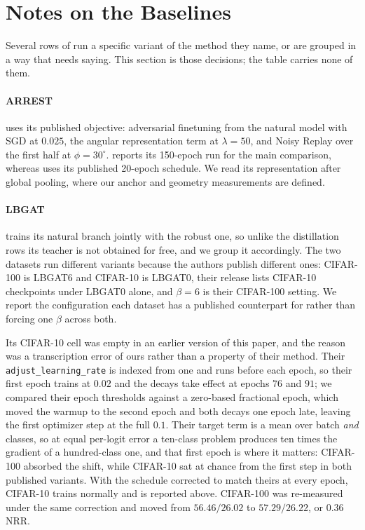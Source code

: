 \section{Notes on the Baselines}
\label{app:baselines}

Several rows of  run a specific variant of the method they name, or are grouped in a
way that needs saying. This section is those decisions; the table carries none of them.

\paragraph{ARREST} uses its published objective: adversarial finetuning from the natural model with
SGD at $0.025$, the angular representation term at $\lambda = 50$, and Noisy Replay over the first
half at $\phi = 30^\circ$.  reports its 150-epoch run for the main comparison, whereas
 uses its published 20-epoch schedule.
We read its representation after global pooling, where our anchor and geometry measurements are
defined.

\paragraph{LBGAT} trains its natural branch jointly with the robust one, so unlike the distillation
rows its teacher is not obtained for free, and we group it accordingly. The two datasets run different
variants because the authors publish different ones: CIFAR-100 is LBGAT6 and CIFAR-10 is LBGAT0, their
release lists CIFAR-10 checkpoints under LBGAT0 alone, and $\beta = 6$ is their CIFAR-100 setting. We
report the configuration each dataset has a published counterpart for rather than forcing one $\beta$
across both.

Its CIFAR-10 cell was empty in an earlier version of this paper, and the reason was a transcription
error of ours rather than a property of their method. Their \texttt{adjust\_learning\_rate} is indexed
from one and runs before each epoch, so their first epoch trains at $0.02$ and the decays take effect
at epochs $76$ and $91$; we compared their epoch thresholds against a zero-based fractional epoch,
which moved the warmup to the second epoch and both decays one epoch late, leaving the first optimizer
step at the full $0.1$. Their target term is a mean over batch \emph{and} classes, so at equal
per-logit error a ten-class problem produces ten times the gradient of a hundred-class one, and that
first epoch is where it matters: CIFAR-100 absorbed the shift, while CIFAR-10 sat at chance from the
first step in both published variants. With the schedule corrected to match theirs at every epoch,
CIFAR-10 trains normally and is reported above. CIFAR-100 was re-measured under the same correction
and moved from $56.46/26.02$ to $57.29/26.22$, or $0.36$ NRR.

